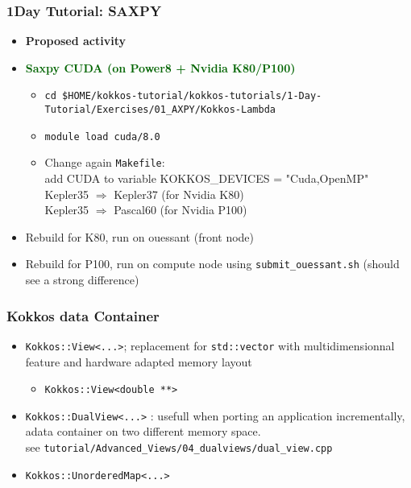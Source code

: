 \begin{frame}[fragile=singleslide]
  \frametitle{1Day Tutorial: SAXPY}

  \begin{itemize}
  \item \textbf{Proposed activity}
  \item \textcolor{darkgreen}{\textbf{Saxpy CUDA (on Power8 + Nvidia K80/P100)}}
    \begin{itemize}
    \item \texttt{cd \$HOME/kokkos-tutorial/kokkos-tutorials/1-Day-Tutorial/Exercises/01\_AXPY/Kokkos-Lambda}
    \item \texttt{module load cuda/8.0}
    \item Change again \texttt{Makefile}: \\
      add CUDA to variable KOKKOS\_DEVICES = "Cuda,OpenMP"\\
      Kepler35 $\Rightarrow$ Kepler37 (for Nvidia K80)\\
      Kepler35 $\Rightarrow$ Pascal60 (for Nvidia P100)
    \end{itemize}
  \item Rebuild for K80, run on ouessant (front node)
  \item Rebuild for P100, run on compute node using \texttt{submit\_ouessant.sh} (should see a strong difference)
  \end{itemize}

\end{frame}


\begin{frame}[fragile=singleslide]
  \frametitle{Kokkos data Container}

  \begin{itemize}
  \item \texttt{Kokkos::View<...>}; replacement for \texttt{std::vector} with multidimensionnal feature and hardware adapted memory layout\\
    \begin{itemize}
    \item \texttt{Kokkos::View<double **>}
    \end{itemize}

  \item \texttt{Kokkos::DualView<...>} : usefull when porting an application incrementally, adata container on two different memory space.\\
    see \texttt{tutorial/Advanced\_Views/04\_dualviews/dual\_view.cpp}
  \item \texttt{Kokkos::UnorderedMap<...>}
  \end{itemize}

\end{frame}
